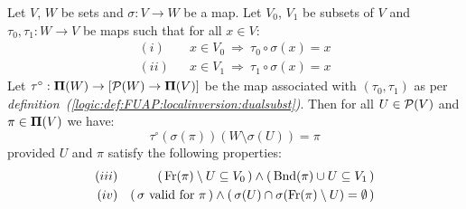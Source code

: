 \begin{lemma}\label{logic:lemma:FUAP:localinversion:Main}
Let $V$, $W$ be sets and $\sigma:V\to W$ be a map. Let $V_{0}$,
$V_{1}$ be subsets of $V$ and $\tau_{0},\tau_{1}:W\to V$ be maps
such that for all $x\in V$:
   \begin{eqnarray*}
    (i)&&x\in V_{0}\ \Rightarrow\ \tau_{0}\circ\sigma(x)=x\\
    (ii)&&x\in V_{1}\ \Rightarrow\ \tau_{1}\circ\sigma(x)=x
    \end{eqnarray*}
Let $\tau^{\circ}:{\bf\Pi}(W)\to[{\cal P}(W)\to\mbox{${\bf\Pi}(V)$}]$ be the map
associated with $(\tau_{0},\tau_{1})$ as per {\em
definition~(\ref{logic:def:FUAP:localinversion:dualsubst})}. Then
for all $U\in{\cal P}(V)$ and $\pi\in\mbox{${\bf\Pi}(V)$}$ we have:
    \begin{equation}\label{logic:eqn:FUAP:localinversion:Main:1}
    \tau^{\circ}(\sigma(\pi))(W\setminus\sigma(U))=\pi
    \end{equation}
provided $U$ and $\pi$ satisfy the following properties:
    \begin{eqnarray*}
    (iii)&&(\,\mbox{\rm Fr}(\pi)\setminus U\subseteq V_{0}\,)
    \land(\,\mbox{\rm Bnd}(\pi)\cup U\subseteq V_{1}\,)\\
    (iv)&&(\,\mbox{$\sigma$ valid for $\pi$}\,)\land
    (\,\sigma(U)\cap\sigma(\mbox{\rm Fr}(\pi)\setminus U)=\emptyset\,)\\
    \end{eqnarray*}
\end{lemma}
